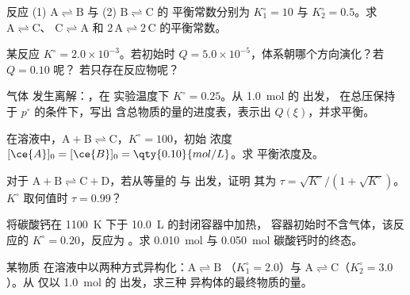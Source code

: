 \begin{exercise}[$\star\star$]\label{exo:b1:extent-q-and-k:5}
反应 (1) $\mathrm{A \rightleftharpoons B}$ 与 (2) $\mathrm{B \rightleftharpoons C}$ 的
平衡常数分别为 $K_1^\circ = 10$ 与 $K_2^\circ = 0.5$。求 $\mathrm{A \rightleftharpoons C}$、
$\mathrm{C \rightleftharpoons A}$ 和 $\mathrm{2\,A \rightleftharpoons 2\,C}$ 的平衡常数。
\end{exercise}

\begin{exercise}[$\star\star$]\label{exo:b1:extent-q-and-k:6}
某反应 $K^\circ = 2.0 \times 10^{-3}$。若初始时
$Q = 5.0 \times 10^{-5}$，体系朝哪个方向演化？若 $Q = 0.10$ 呢？
若只存在反应物呢？
\end{exercise}

\begin{exercise}[$\star\star$]\label{exo:b1:extent-q-and-k:7}
气体  发生离解：，在
实验温度下 $K^\circ = 0.25$。从 \qty{1.0}{mol} 的  出发，
在总压保持于 $p^\circ$ 的条件下，写出
含总物质的量的进度表，表示出 $Q(\xi)$，并求平衡。
\end{exercise}

\begin{exercise}[$\star\star$]\label{exo:b1:extent-q-and-k:8}
在溶液中，$\mathrm{A + B \rightleftharpoons C}$，$K^\circ = 100$，初始
浓度 $[\ce{A}]_0 = [\ce{B}]_0 = \qty{0.10}{mol/L}$。求
平衡浓度及。
\end{exercise}

\begin{exercise}[$\star\star$]\label{exo:b1:extent-q-and-k:9}
对于 $\mathrm{A + B \rightleftharpoons C + D}$，若从等量的  与  出发，证明
其为 $\tau = \sqrt{K^\circ}/(1 + \sqrt{K^\circ})$。
$K^\circ$ 取何值时 $\tau = 0.99$？
\end{exercise}

\begin{exercise}[$\star\star\star$]\label{exo:b1:extent-q-and-k:10}
将碳酸钙在 \qty{1100}{K} 下于 \qty{10.0}{L} 的封闭容器中加热，
容器初始时不含气体，该反应的 $K^\circ = 0.20$，反应为
。求
\qty{0.010}{mol} 与 \qty{0.050}{mol} 碳酸钙时的终态。
\end{exercise}

\begin{exercise}[$\star\star\star$]\label{exo:b1:extent-q-and-k:11}
某物质  在溶液中以两种方式异构化：$\mathrm{A \rightleftharpoons B}$
（$K_1^\circ = 2.0$）与 $\mathrm{A \rightleftharpoons C}$（$K_2^\circ = 3.0$）。从
仅以 \qty{1.0}{mol} 的  出发，求三种
异构体的最终物质的量。
\end{exercise}


